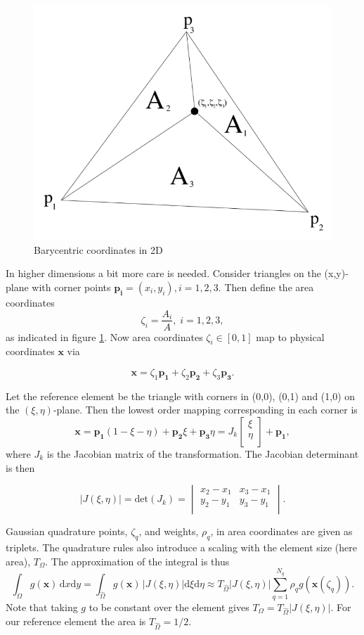 \documentclass[paper=a4, fontsize=11pt]{scrartcl} %
\begin{document}
\begin{figure}[!htb]
\center
  \includegraphics[width=0.5\linewidth]{areacoord.png}
  \caption{Barycentric coordinates in 2D}\label{fig:areacoord}
\end{figure}
In higher dimensions a bit more care is needed. Consider triangles on the (x,y)-plane with corner points $\mathbf{p_i}=(x_i,y_i), i=1,2,3$. Then define the area coordinates 
\[ \zeta_i = \frac{A_i}{A}, \; i=1,2,3,\]
as indicated in figure \ref{fig:areacoord}. Now area coordinates $\zeta_i \in [0,1]$ map to physical coordinates $\mathbf{x}$ via

\[ \mathbf{x} = \zeta_1\mathbf{p_1} +\zeta_2\mathbf{p_2} +\zeta_3\mathbf{p_3}.
\]

Let the reference element be the triangle with corners in (0,0), (0,1) and (1,0) on the $(\xi,\eta)$-plane. Then the lowest order mapping corresponding in each corner is
\[ \mathbf{x}= \mathbf{p_1}(1-\xi-\eta) +\mathbf{p_2}\xi +\mathbf{p_3}\eta = J_k\left[ \begin{array}{c} \xi\\ \eta\\ \end{array} \right] + \mathbf{p_1},
\]
where $J_k$ is the Jacobian matrix of the transformation. The Jacobian determinant is then

\begin{equation}
|J(\xi,\eta)| = \mathrm{det}(J_k) = \begin{vmatrix}
  x_2-x_1 & x_3-x_1 \\
  y_2-y_1 & y_3-y_1 \\
\end{vmatrix}.
  \label{eq:jacobian2d}
\end{equation}

Gaussian quadrature points, $\zeta_q$, and weights, $\rho_q$, in area coordinates are given as triplets. The quadrature rules also introduce a scaling with the element size (here area), $T_\Omega$. The approximation of the integral is thus
\[ \int_{\Omega} \! g(\mathbf{x}) \, \mathrm{d}x\mathrm{d}y = \int_{\hat{\Omega}} \! g(\mathbf{x}) \, |J(\xi,\eta)| \mathrm{d}\xi \mathrm{d}\eta \approx T_{\hat{\Omega}} |J(\xi,\eta)| \sum_{q=1}^{N_q} \rho_{q}g(\mathbf{x}(\zeta_q)).
\]
Note that taking $g$ to be constant over the element gives $T_{\Omega}=T_{\hat{\Omega}} |J(\xi,\eta)|$. For our reference element the area is $T_{\hat{\Omega}}=1/2$.
\end{document}
